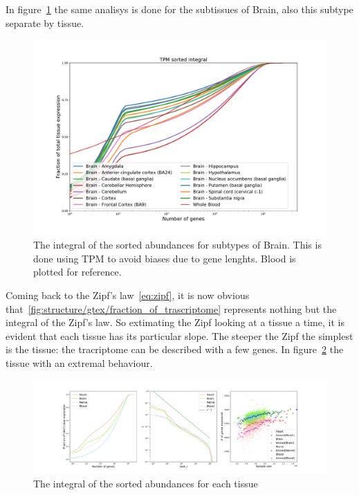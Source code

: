In figure~\ref{fig:structure/gtex/fraction_of_trascriptome_Brain} the same analisys is done for the subtissues of Brain, also this subtype separate by tissue.
\begin{figure}[htb!]
  \centering
  \includegraphics[width=0.9\linewidth]{pictures/structure/gtex/fraction_of_trascriptome_Brain.pdf}
  \caption{The integral of the sorted abundances for subtypes of Brain. This is done using TPM to avoid biases due to gene lenghts. Blood is plotted for reference.}
  \label{fig:structure/gtex/fraction_of_trascriptome_Brain}
\end{figure}

Coming back to the Zipf's law~\ref{eq:zipf}, it is now obvious that~\ref{fig:structure/gtex/fraction_of_trascriptome} represents nothing but the integral of the Zipf's law. So extimating the Zipf looking at a tissue a time, it is evident that each tissue has its particular slope. The steeper the Zipf the simplest is the tissue: the tracriptome can be described with a few genes. In figure~\ref{fig:structure/gtex/zipf_tissue} the tissue with an extremal behaviour.
\begin{figure}[htb!]
  \centering
  \includegraphics[width=0.6\linewidth]{pictures/structure/gtex/zipf_tissue.pdf}
  \caption{The integral of the sorted abundances for each tissue}
  \label{fig:structure/gtex/zipf_tissue}
\end{figure}

